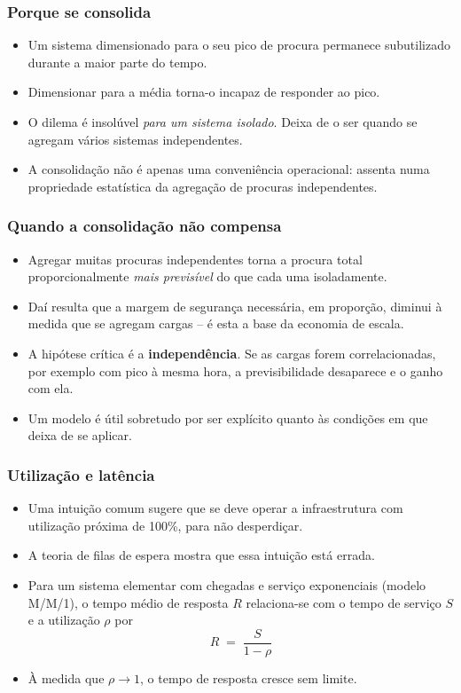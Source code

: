 \documentclass[aspectratio=169]{beamer}
\begin{document}
\begin{frame}
\frametitle{Porque se consolida}
\begin{itemize}
    \setlength\itemsep{0.35cm}
    \item Um sistema dimensionado para o seu pico de procura permanece subutilizado durante a maior parte do tempo.
    \item Dimensionar para a média torna-o incapaz de responder ao pico.
    \item O dilema é insolúvel \emph{para um sistema isolado}. Deixa de o ser quando se agregam vários sistemas independentes.
    \item A consolidação não é apenas uma conveniência operacional: assenta numa propriedade estatística da agregação de procuras independentes.
\end{itemize}
\end{frame}



\begin{frame}
\frametitle{Quando a consolidação não compensa}
\begin{itemize}
    \setlength\itemsep{0.35cm}
    \item Agregar muitas procuras independentes torna a procura total proporcionalmente \emph{mais previsível} do que cada uma isoladamente.
    \item Daí resulta que a margem de segurança necessária, em proporção, diminui à medida que se agregam cargas -- é esta a base da economia de escala.
    \item A hipótese crítica é a \textbf{independência}. Se as cargas forem correlacionadas, por exemplo com pico à mesma hora, a previsibilidade desaparece e o ganho com ela.
    \item Um modelo é útil sobretudo por ser explícito quanto às condições em que deixa de se aplicar.
\end{itemize}
\end{frame}

\begin{frame}
\frametitle{Utilização e latência}
\begin{itemize}
    \setlength\itemsep{0.3cm}
    \item Uma intuição comum sugere que se deve operar a infraestrutura com utilização próxima de 100\%, para não desperdiçar.
    \item A teoria de filas de espera mostra que essa intuição está errada.
    \item Para um sistema elementar com chegadas e serviço exponenciais (modelo M/M/1), o tempo médio de resposta $R$ relaciona-se com o tempo de serviço $S$ e a utilização $\rho$ por
    \[
      R \;=\; \frac{S}{1-\rho}
    \]
    \item À medida que $\rho \rightarrow 1$, o tempo de resposta cresce sem limite.
\end{itemize}
\end{frame}
\end{document}
